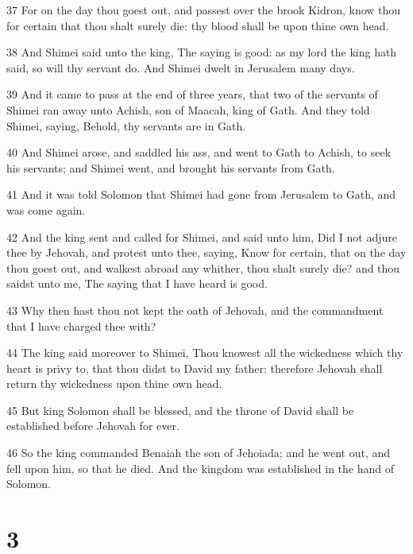 \par 37 For on the day thou goest out, and passest over the brook Kidron, know thou for certain that thou shalt surely die: thy blood shall be upon thine own head.
\par 38 And Shimei said unto the king, The saying is good: as my lord the king hath said, so will thy servant do. And Shimei dwelt in Jerusalem many days.
\par 39 And it came to pass at the end of three years, that two of the servants of Shimei ran away unto Achish, son of Maacah, king of Gath. And they told Shimei, saying, Behold, thy servants are in Gath.
\par 40 And Shimei arose, and saddled his ass, and went to Gath to Achish, to seek his servants; and Shimei went, and brought his servants from Gath.
\par 41 And it was told Solomon that Shimei had gone from Jerusalem to Gath, and was come again.
\par 42 And the king sent and called for Shimei, and said unto him, Did I not adjure thee by Jehovah, and protest unto thee, saying, Know for certain, that on the day thou goest out, and walkest abroad any whither, thou shalt surely die? and thou saidst unto me, The saying that I have heard is good.
\par 43 Why then hast thou not kept the oath of Jehovah, and the commandment that I have charged thee with?
\par 44 The king said moreover to Shimei, Thou knowest all the wickedness which thy heart is privy to, that thou didst to David my father: therefore Jehovah shall return thy wickedness upon thine own head.
\par 45 But king Solomon shall be blessed, and the throne of David shall be established before Jehovah for ever.
\par 46 So the king commanded Benaiah the son of Jehoiada; and he went out, and fell upon him, so that he died. And the kingdom was established in the hand of Solomon.

\chapter{3}

